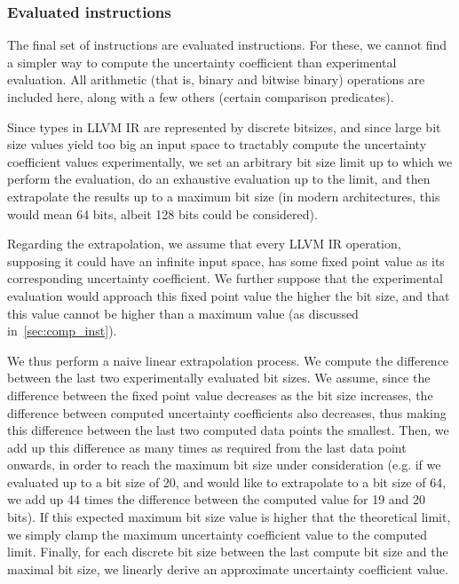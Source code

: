 \documentclass[a4paper]{article}
\newcommand{\cmnt}[2]{{\color{red}{\textbf{#1:} #2}}}
\newcommand{\AL}[1]{\cmnt{AL}{#1}}
\begin{document}
\subsubsection*{Evaluated instructions}
The final set of instructions are evaluated instructions. For these, we cannot
find a simpler way to compute the uncertainty coefficient than experimental
evaluation. All arithmetic (that is, binary and bitwise binary) operations are
included here, along with a few others (certain comparison predicates).

Since types in LLVM IR are represented by discrete bitsizes, and since large
bit size values yield too big an input space to tractably compute the
uncertainty coefficient values experimentally, we set an arbitrary bit size
limit up to which we perform the evaluation, do an exhaustive evaluation up to
the limit, and then extrapolate the results up to a maximum bit size (in modern
architectures, this would mean 64 bits, albeit 128 bits could be considered).

Regarding the extrapolation, we assume that every LLVM IR operation, supposing
it could have an infinite input space, has some fixed point value as its
corresponding uncertainty coefficient. We further suppose that the experimental
evaluation would approach this fixed point value the higher the bit size, and
that this value cannot be higher than a maximum value (as discussed
in~\autoref{sec:comp_inst}).

We thus perform a naive linear extrapolation process. We compute the difference
between the last two experimentally evaluated bit sizes. We assume, since the
difference between the fixed point value decreases as the bit size increases,
the difference between computed uncertainty coefficients also decreases, thus
making this difference between the last two computed data points the smallest.
Then, we add up this difference as many times as required from the last data
point onwards, in order to reach the maximum bit size under consideration (e.g.
if we evaluated up to a bit size of 20, and would like to extrapolate to a bit
size of 64, we add up 44 times the difference between the computed value for 19
and 20 bits). If this expected maximum bit size value is higher \AL{Lower, for
decaying functions} that the theoretical limit, we simply clamp the maximum
uncertainty coefficient value to the computed limit. Finally, for each discrete
bit size between the last compute bit size and the maximal bit size, we
linearly derive an approximate uncertainty coefficient value.
\end{document}
